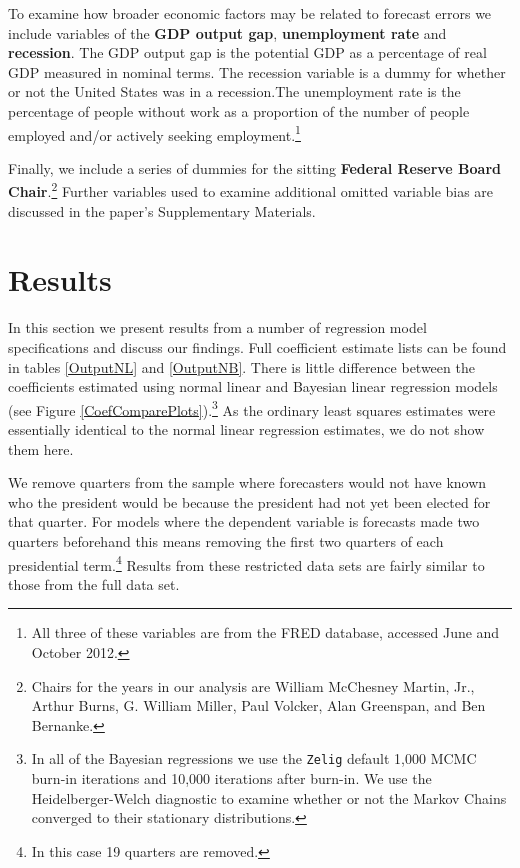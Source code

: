\documentclass[a4paper]{article}\usepackage[]{graphicx}\usepackage[]{color}
\begin{document}
To examine how broader economic factors may be related to forecast errors we include variables of the {\bf{GDP output gap}}, {\bf{unemployment rate}} and {\bf{recession}}. The GDP output gap is the potential GDP as a percentage of real GDP measured in nominal terms. The recession variable is a dummy for whether or not the United States was in a recession.The unemployment rate is the percentage of people without work as a proportion of the number of people employed and/or actively seeking employment.\footnote{All three of these variables are from the FRED database, accessed June and October 2012.}

Finally, we include a series of dummies for the sitting {\bf{Federal Reserve Board Chair}}.\footnote{Chairs for the years in our analysis are William McChesney Martin, Jr., Arthur Burns, G. William Miller, Paul Volcker, Alan Greenspan, and Ben Bernanke.} Further variables used to examine additional omitted variable bias are discussed in the paper's Supplementary Materials.

\section{Results}

In this section we present results from a number of regression model specifications and discuss our findings. Full coefficient estimate lists can be found in tables \ref{OutputNL} and \ref{OutputNB}. There is little difference between the coefficients estimated using normal linear and Bayesian linear regression models (see Figure \ref{CoefComparePlots}).\footnote{In all of the Bayesian regressions we use the {\tt{Zelig}} default 1,000 MCMC burn-in iterations and 10,000 iterations after burn-in. We use the Heidelberger-Welch diagnostic to examine whether or not the Markov Chains converged to their stationary distributions.} As the ordinary least squares estimates were essentially identical to the normal linear regression estimates, we do not show them here.

We remove quarters from the sample where forecasters would not have known who the president would be because the president had not yet been elected for that quarter. For models where the dependent variable is forecasts made two quarters beforehand this means removing the first two quarters of each presidential term.\footnote{In this case 19 quarters are removed.} Results from these restricted data sets are fairly similar to those from the full data set.
\end{document}
